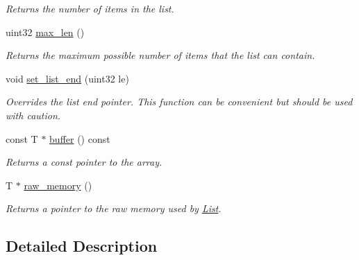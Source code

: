 \begin{DoxyCompactItemize}
\begin{DoxyCompactList}\small\item\em Returns the number of items in the list. \end{DoxyCompactList}\item 
\hypertarget{classetk_1_1_list_af38a32c25ece381c033d9013141a0f12}{uint32 \hyperlink{classetk_1_1_list_af38a32c25ece381c033d9013141a0f12}{max\-\_\-len} ()}\label{classetk_1_1_list_af38a32c25ece381c033d9013141a0f12}

\begin{DoxyCompactList}\small\item\em Returns the maximum possible number of items that the list can contain. \end{DoxyCompactList}\item 
\hypertarget{classetk_1_1_list_ae5ff761960ef80143162ac2d4cd6a456}{void \hyperlink{classetk_1_1_list_ae5ff761960ef80143162ac2d4cd6a456}{set\-\_\-list\-\_\-end} (uint32 le)}\label{classetk_1_1_list_ae5ff761960ef80143162ac2d4cd6a456}

\begin{DoxyCompactList}\small\item\em Overrides the list end pointer. This function can be convenient but should be used with caution. \end{DoxyCompactList}\item 
\hypertarget{classetk_1_1_list_a765da91f522c96c94efec3790b5a63b5}{const T $\ast$ \hyperlink{classetk_1_1_list_a765da91f522c96c94efec3790b5a63b5}{buffer} () const }\label{classetk_1_1_list_a765da91f522c96c94efec3790b5a63b5}

\begin{DoxyCompactList}\small\item\em Returns a const pointer to the array. \end{DoxyCompactList}\item 
\hypertarget{classetk_1_1_list_add87c29d6b7283b6329a01c3b1eae898}{T $\ast$ \hyperlink{classetk_1_1_list_add87c29d6b7283b6329a01c3b1eae898}{raw\-\_\-memory} ()}\label{classetk_1_1_list_add87c29d6b7283b6329a01c3b1eae898}

\begin{DoxyCompactList}\small\item\em Returns a pointer to the raw memory used by \hyperlink{classetk_1_1_list}{List}. \end{DoxyCompactList}\end{DoxyCompactItemize}


\subsection{Detailed Description}
